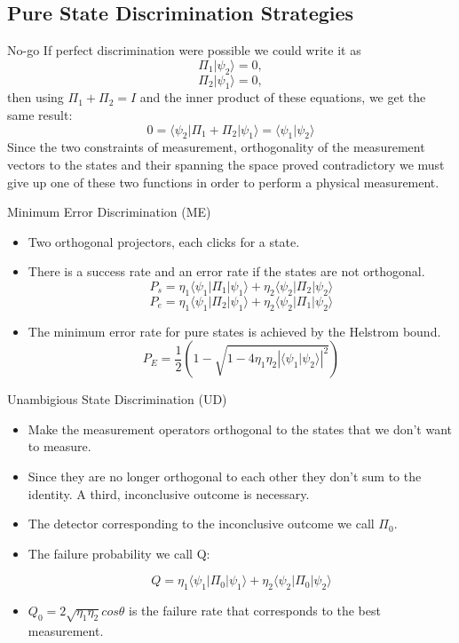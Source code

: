 \documentclass{beamer}
\newcommand{\abs}[1]{\left|{#1}\right|}
\newcommand{\br}[1]{\langle #1|}
\newcommand{\ke}[1]{|#1\rangle}
\newcommand{\bk}[2]{\langle #1|#2\rangle}
\newcommand{\var}[2]{\langle #1|#2\rangle}
\newcommand{\ov}[2]{\abs{\var{#1}{#2}}^2}
\begin{document}
\subsection{Pure State Discrimination Strategies}

\begin{frame}{No-go}
If perfect discrimination were possible we could write it as
\[\Pi_1 \ke {\psi_2} = 0,\]
\[\Pi_2 \ke {\psi_1} = 0,\]
then using $\Pi_1 + \Pi_2 = I$ and the inner product of these equations, we get the same result:
\[0= \br{\psi_2} \Pi_1 + \Pi_2 \ke {\psi_1} = \bk{\psi_1}{\psi_2} \]
 Since the two constraints of measurement,
orthogonality of the measurement vectors to the states and their spanning the space proved contradictory we must give up one of these two
functions in order to perform a physical measurement.
\end{frame}
\begin{frame}{Minimum Error Discrimination (ME)}
\begin{itemize}
\item
	Two orthogonal projectors, each clicks for a state.
\pause
\item
	There is a success rate and an error rate if the states are not orthogonal.
\[ P_s =\eta_1 \br {\psi_1} \Pi_1\ke {\psi_1} + \eta_2 \br {\psi_2} \Pi_2\ke {\psi_2}\]
\[ P_e = \eta_1 \br {\psi_1} \Pi_2\ke {\psi_1} + \eta_2 \br {\psi_2} \Pi_1\ke {\psi_2}\]
\pause
\item
	The minimum error rate for pure states is achieved by the Helstrom bound.
\[P_E = \frac{1}{2}(1- \sqrt{1-4 \eta_1 \eta_2 \ov{\psi_1}{\psi_2}})\]
\end{itemize}
\end{frame}

\begin{frame}{Unambigious State Discrimination (UD)}



\begin{itemize}
\pause
\item
	Make the measurement operators orthogonal to the states that we don't want to measure.
\pause
\item
	Since they are no longer orthogonal to each other they don't sum to the identity. A third, inconclusive outcome is necessary.
\item
	The detector corresponding to the inconclusive outcome we call $\Pi_0$.
\pause

\item
	The failure probability we call Q:

\[Q =  \eta_1 \br {\psi_1} \Pi_0\ke {\psi_1} + \eta_2 \br {\psi_2} \Pi_0\ke {\psi_2}\]
\pause
\item
$ Q_0 = 2 \sqrt{\eta_1\eta_2} cos \theta$  is the failure rate that corresponds to the best measurement.
\end{itemize}

\end{frame}
\end{document}
